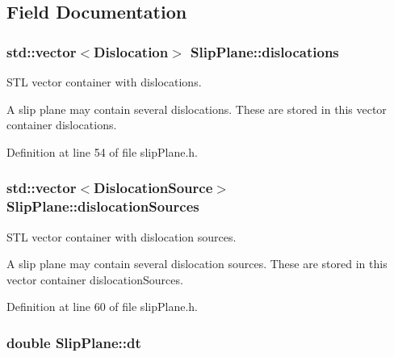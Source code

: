 \subsection{\-Field \-Documentation}
\hypertarget{classSlipPlane_ad92c7c409f7e161db449528389180910}{
\subsubsection[{dislocations}]{\setlength{\rightskip}{0pt plus 5cm}std\-::vector$<${\bf \-Dislocation}$>$ {\bf \-Slip\-Plane\-::dislocations}}}\label{db/d25/classSlipPlane_ad92c7c409f7e161db449528389180910}


\-S\-T\-L vector container with dislocations. 

\-A slip plane may contain several dislocations. \-These are stored in this vector container dislocations. 

\-Definition at line 54 of file slip\-Plane.\-h.

\hypertarget{classSlipPlane_a8e31e904fc6e68cc7ba70b0b57a278cc}{
\subsubsection[{dislocation\-Sources}]{\setlength{\rightskip}{0pt plus 5cm}std\-::vector$<${\bf \-Dislocation\-Source}$>$ {\bf \-Slip\-Plane\-::dislocation\-Sources}}}\label{db/d25/classSlipPlane_a8e31e904fc6e68cc7ba70b0b57a278cc}


\-S\-T\-L vector container with dislocation sources. 

\-A slip plane may contain several dislocation sources. \-These are stored in this vector container dislocation\-Sources. 

\-Definition at line 60 of file slip\-Plane.\-h.

\hypertarget{classSlipPlane_ad786135547799363ad2931e43522c2be}{
\subsubsection[{dt}]{\setlength{\rightskip}{0pt plus 5cm}double {\bf \-Slip\-Plane\-::dt}}}\label{db/d25/classSlipPlane_ad786135547799363ad2931e43522c2be}


